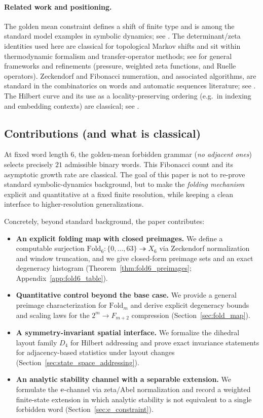 \paragraph{Related work and positioning.}
The golden mean constraint defines a shift of finite type and is among the standard model examples in symbolic dynamics; see \cite{LindMarcus1995}.
The determinant/zeta identities used here are classical for topological Markov shifts and sit within thermodynamic formalism and transfer-operator methods; see \cite{Bowen1975,Ruelle1978,ParryPollicott1990} for general frameworks and refinements (pressure, weighted zeta functions, and Ruelle operators).
Zeckendorf and Fibonacci numeration, and associated algorithms, are standard in the combinatorics on words and automatic sequences literature; see \cite{AlloucheShallit2003,Lothaire2002}.
The Hilbert curve and its use as a locality-preserving ordering (e.g.\ in indexing and embedding contexts) are classical; see \cite{Hilbert1891,Sagan1994,MoonJagadishFaloutsosSaltz2001}.

\subsection{Contributions (and what is classical)}
\label{subsec:intro_contrib}
At fixed word length $6$, the golden-mean forbidden grammar (\emph{no adjacent ones}) selects precisely $21$ admissible binary words.
This Fibonacci count and its asymptotic growth rate are classical.
The goal of this paper is not to re-prove standard symbolic-dynamics background, but to make the \emph{folding mechanism} explicit and quantitative at a fixed finite resolution, while keeping a clean interface to higher-resolution generalizations.

Concretely, beyond standard background, the paper contributes:
\begin{itemize}
\item \textbf{An explicit folding map with closed preimages.}
We define a computable surjection $\mathrm{Fold}_6:\{0,\dots,63\}\twoheadrightarrow X_6$ via Zeckendorf normalization and window truncation, and we give closed-form preimage sets and an exact degeneracy histogram (Theorem~\ref{thm:fold6_preimages}; Appendix~\ref{app:fold6_table}).
\item \textbf{Quantitative control beyond the base case.}
We provide a general preimage characterization for $\mathrm{Fold}_m$ and derive explicit degeneracy bounds and scaling laws for the $2^m\to F_{m+2}$ compression (Section~\ref{sec:fold_map}).
\item \textbf{A symmetry-invariant spatial interface.}
We formalize the dihedral layout family $D_4$ for Hilbert addressing and prove exact invariance statements for adjacency-based statistics under layout changes (Section~\ref{sec:state_space_addressing}).
\item \textbf{An analytic stability channel with a separable extension.}
We formulate the $\mathrm{e}$-channel via zeta/Abel normalization and record a weighted finite-state extension in which analytic stability is not equivalent to a single forbidden word (Section~\ref{sec:e_constraint}).
\end{itemize}

